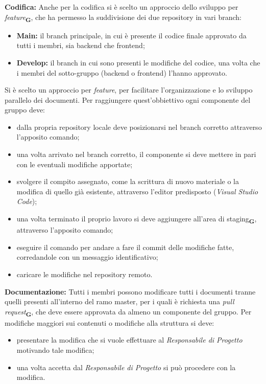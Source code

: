 \textbf{Codifica:} Anche per la codifica si è scelto un approccio dello sviluppo per \textit{feature}\textsubscript{\textbf{G}}, che ha permesso la suddivisione dei due repository in vari branch:
\begin{itemize}
    \renewcommand\labelitemi{-}
    \item \textbf{Main:} il branch principale, in cui è presente il codice finale approvato da tutti i membri, sia backend che frontend;
    \item \textbf{Develop:} il branch in cui sono presenti le modifiche del codice, una volta che i membri del sotto-gruppo (backend o frontend) l'hanno approvato.
\end{itemize}
Si è scelto un approccio per \textit{feature}, per facilitare l'organizzazione e lo sviluppo parallelo dei documenti. Per raggiungere quest'obbiettivo ogni componente del gruppo deve:
\begin{itemize}
    \renewcommand\labelitemi{-}
    \item dalla propria repository locale deve posizionarsi nel branch corretto attraverso l'apposito comando;
    \item una volta arrivato nel branch corretto, il componente si deve mettere in pari con le eventuali modifiche apportate;
    \item svolgere il compito assegnato, come la scrittura di nuovo materiale o la modifica di quello già esistente, attraverso l'editor predisposto (\textit{Visual Studio Code});
    \item una volta terminato il proprio lavoro si deve aggiungere all'area di staging\textsubscript{\textbf{G}}, attraverso l'apposito comando;
    \item eseguire il comando per andare a fare il commit delle modifiche fatte, corredandole con un messaggio identificativo;
    \item caricare le modifiche nel repository remoto.
\end{itemize}
\textbf{Documentazione:}
Tutti i membri possono modificare tutti i documenti tranne quelli presenti all'interno del ramo master, per i quali è richiesta una \textit{pull request}\textsubscript{\textbf{G}}, che deve essere approvata da almeno un componente del gruppo.
Per modifiche maggiori sui contenuti o modifiche alla struttura si deve:
\begin{itemize}
    \renewcommand\labelitemi{-}
    \item presentare la modifica che si vuole effettuare al \textit{Responsabile di Progetto} motivando tale modifica;
    \item una volta accetta dal \textit{Responsabile di Progetto} si può procedere con la modifica.
\end{itemize}
